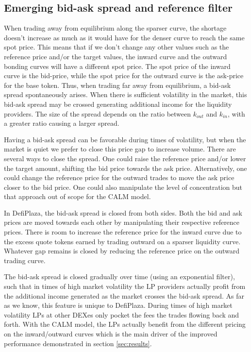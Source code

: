 \documentclass [10pt, twoside] {article}
\begin{document}
\subsection{Emerging bid-ask spread and reference filter}
When trading away from equilibrium along the sparser curve, the shortage doesn't increase as much as it would have for the denser curve to reach the same spot price. This means that if we don't change any other values such as the reference price and/or the target values, the inward curve and the outward bonding curves will have a different spot price. The spot price of the inward curve is the bid-price, while the spot price for the outward curve is the ask-price for the base token. Thus, when trading far away from equilibrium, a bid-ask spread spontaneously arises. When there is sufficient volatility in the market, this bid-ask spread may be crossed generating additional income for the liquidity providers. The size of the spread depends on the ratio between $k_{out}$ and $k_{in}$, with a greater ratio causing a larger spread.

Having a bid-ask spread can be favorable during times of volatility, but when the market is quiet we prefer to close this price gap to increase volume. There are several ways to close the spread. One could raise the reference price and/or lower the target amount, shifting the bid price towards the ask price. Alternatively, one could change the reference price for the outward trades to move the ask price closer to the bid price. One could also manipulate the level of concentration but that approach out of scope for the CALM model.

In DefiPlaza, the bid-ask spread is closed from both sides. Both the bid and ask prices are moved towards each other by manipulating their respective reference prices. There is room to increase the reference price for the inward curve due to the excess quote tokens earned by trading outward on a sparser liquidity curve. Whatever gap remains is closed by reducing the reference price on the outward trading curve.

The bid-ask spread is closed gradually over time (using an exponential filter), such that in times of high market volatility the LP providers actually profit from the additional income generated as the market crosses the bid-ask spread. As far as we know, this feature is unique to DefiPlaza. During times of high market volatility LPs at other DEXes only pocket the fees the trades flowing back and forth. With the CALM model, the LPs actually benefit from the different pricing on the inward/outward curves which is the main driver of the improved performance demonstrated in section \ref{sec:results}.
\end{document}
